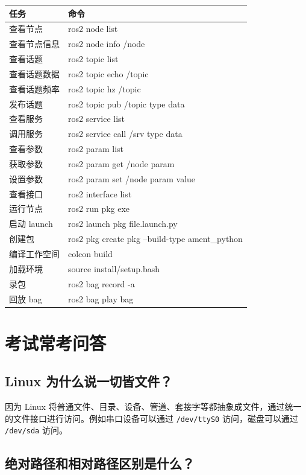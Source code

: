 \documentclass[UTF8,a4paper,12pt]{ctexart}
\begin{document}
\begin{longtable}{p{4cm}p{10cm}}
\toprule
任务 & 命令 \\
\midrule
查看节点 & ros2 node list \\
查看节点信息 & ros2 node info /node \\
查看话题 & ros2 topic list \\
查看话题数据 & ros2 topic echo /topic \\
查看话题频率 & ros2 topic hz /topic \\
发布话题 & ros2 topic pub /topic type data \\
查看服务 & ros2 service list \\
调用服务 & ros2 service call /srv type data \\
查看参数 & ros2 param list \\
获取参数 & ros2 param get /node param \\
设置参数 & ros2 param set /node param value \\
查看接口 & ros2 interface list \\
运行节点 & ros2 run pkg exe \\
启动 launch & ros2 launch pkg file.launch.py \\
创建包 & ros2 pkg create pkg --build-type ament\_python \\
编译工作空间 & colcon build \\
加载环境 & source install/setup.bash \\
录包 & ros2 bag record -a \\
回放 bag & ros2 bag play bag \\
\bottomrule
\end{longtable}

\section{考试常考问答}

\subsection{Linux 为什么说一切皆文件？}

因为 Linux 将普通文件、目录、设备、管道、套接字等都抽象成文件，通过统一的文件接口进行访问。例如串口设备可以通过 \texttt{/dev/ttyS0} 访问，磁盘可以通过 \texttt{/dev/sda} 访问。

\subsection{绝对路径和相对路径区别是什么？}
\end{document}
